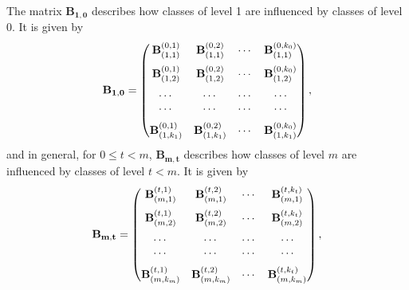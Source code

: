 \documentclass[article,12pt]{article}
\theoremstyle{plain}
\theoremstyle{definition}
\theoremstyle{remark}
\numberwithin{equation}{section}
\numberwithin{theorem}{section}
\begin{document}
		
		
		The matrix $\mathbf{B_{1, 0}}$ describes how classes of level 1 are influenced by classes of level 0. It is given by\\
		
		$$ \mathbf{B_{1, 0}}=\left(\begin{matrix}
			\mathbf{B}_{(1,1)}^{(0,1)} &   \mathbf{B}_{(1,1)}^{(0,2)}  & \cdots &\mathbf{B}_{(1,1)}^{(0, k_0)} \vspace{0.2cm} \\
			\mathbf{B}_{(1, 2)}^{(0,1)}  & \mathbf{B}_{(1,2)}^{(0,2)}  &  \cdots & \mathbf{B}_{(1,2)}^{(0, k_0)}  \vspace{0.2cm}\\
			\cdots & \cdots & \cdots & \cdots \\
			\cdots & \cdots & \cdots & \cdots  \vspace{0.2cm} \\
			\mathbf{B}_{(1, k_1)}^{(0,1)}  & \mathbf{B}_{(1,  k_1)}^{(0, 2)}  & \cdots & \mathbf{B}_{(1,k_1)}^{(0,k_0)} 
		\end{matrix}\right),
		$$      
		and in general, for $0\leq t<m$, $\mathbf{B_{m,t}}$ describes how classes of level $m$ are influenced by classes of level $t<m$. It is given by 
		$$ \mathbf{B_{m, t}}=\left(\begin{matrix}
			\mathbf{B}_{(m,1)}^{(t,1)} &   \mathbf{B}_{(m ,1)}^{(t,2)}  & \cdots &\mathbf{B}_{(m,1)}^{(t, k_t)} \vspace{0.2cm} \\
			\mathbf{B}_{(m, 2)}^{(t,1)}  & \mathbf{B}_{(m,2)}^{(t,2)}  &  \cdots & \mathbf{B}_{(m,2)}^{(t, k_t)}  \vspace{0.2cm}\\
			\cdots & \cdots & \cdots & \cdots \\
			\cdots & \cdots & \cdots & \cdots  \vspace{0.2cm} \\
			\mathbf{B}_{(m, k_m)}^{(t,1)}  & \mathbf{B}_{(m,  k_m)}^{(t, 2)}  & \cdots & \mathbf{B}_{(m,k_m)}^{(t, k_t)} 
		\end{matrix}\right),
		$$     
		
\end{document}
